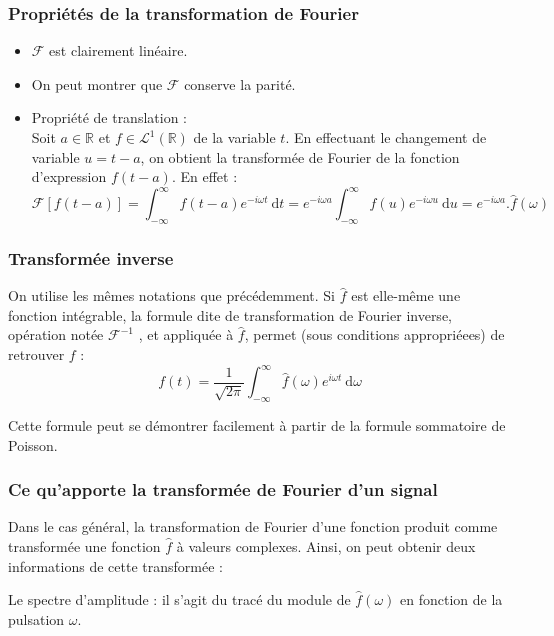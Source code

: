 \subsubsection{Propriétés de la transformation de Fourier} 
\begin{itemize}
\item $\mathcal{F}$ est clairement linéaire. \\
\item On peut montrer que $\mathcal{F}$ conserve la parité. \\
\item Propriété de translation : \\ Soit $a \in \mathbb{R}$ et $f\in \mathcal{L}^{1}(\mathbb{R})$ de la variable $t$. En effectuant le changement de variable $u=t-a$, on obtient la transformée de Fourier de la fonction d'expression $f(t-a)$. En effet : 
$$ \mathcal{F}[f(t-a)]=\displaystyle\int_{-\infty}^{\infty}f(t-a)e^{-i\omega t}\:\mathrm{d}t=\displaystyle e^{-i\omega a}\int_{-\infty}^{\infty}f(u)e^{-i \omega u}\:\mathrm{d}u=\displaystyle e^{-i\omega a}.\hat{f}(\omega) $$

\end{itemize}
 

\subsubsection{Transformée inverse}

On utilise les mêmes notations que précédemment.
Si $\hat{f}$ est elle-même une fonction intégrable, la formule dite de transformation de Fourier inverse, opération notée $\mathcal{F}^{-1}$ , et appliquée à $\hat{f}$, permet (sous conditions appropriéees) de retrouver $f$ :
$$ f(t)=\displaystyle{\frac{1}{\sqrt{2\pi}}\int_{-\infty}^{\infty}\hat{f}(\omega)e^{i\omega t}\:\mathrm{d}\omega}$$

Cette formule peut se démontrer facilement à partir de la formule sommatoire de Poisson.

\subsubsection{Ce qu'apporte la transformée de Fourier d'un signal}
Dans le cas général, la transformation de Fourier d'une fonction produit comme transformée une fonction $\hat{f}$ à valeurs complexes. Ainsi, on peut obtenir deux informations de cette transformée :

Le spectre d'amplitude : il s'agit du tracé du module de $\hat{f}(\omega)$ en fonction de la pulsation $\omega$.

